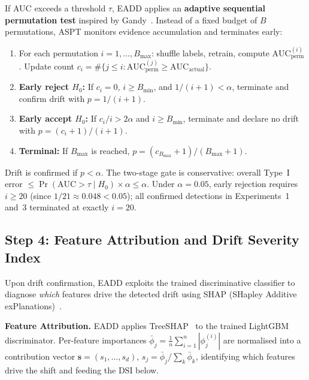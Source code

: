 \documentclass[conference,a4paper]{IEEEtran}
\begin{document}
If AUC exceeds a threshold $\tau$, EADD applies an \textbf{adaptive sequential permutation test} inspired by Gandy~\cite{b30}. Instead of a fixed budget of $B$ permutations, ASPT monitors evidence accumulation and terminates early:
\begin{enumerate}
    \item For each permutation $i = 1, \ldots, B_{\max}$: shuffle labels, retrain, compute $\text{AUC}^{(i)}_{\text{perm}}$. Update count $c_i = \#\{j \leq i : \text{AUC}^{(j)}_{\text{perm}} \geq \text{AUC}_{\text{actual}}\}$.
    \item \textbf{Early reject $H_0$:} If $c_i = 0$, $i \geq B_{\min}$, and $1/(i+1) < \alpha$, terminate and confirm drift with $p = 1/(i+1)$.
    \item \textbf{Early accept $H_0$:} If $c_i/i > 2\alpha$ and $i \geq B_{\min}$, terminate and declare no drift with $p = (c_i+1)/(i+1)$.
    \item \textbf{Terminal:} If $B_{\max}$ is reached, $p = (c_{B_{\max}}{+}1)/(B_{\max}{+}1)$.
\end{enumerate}
Drift is confirmed if $p < \alpha$. The two-stage gate is conservative: overall Type~I error $\leq \Pr(\text{AUC}{>}\tau \mid H_0) \times \alpha \leq \alpha$. Under $\alpha = 0.05$, early rejection requires $i \geq 20$ (since $1/21 \approx 0.048 < 0.05$); all confirmed detections in Experiments~1 and~3 terminated at exactly $i = 20$.

\subsection{Step 4: Feature Attribution and Drift Severity Index}

Upon drift confirmation, EADD exploits the trained discriminative classifier to diagnose \textit{which} features drive the detected drift using SHAP (SHapley Additive exPlanations)~\cite{b24}.

\textbf{Feature Attribution.} EADD applies TreeSHAP~\cite{b31} to the trained LightGBM discriminator. Per-feature importances $\bar{\phi}_j = \frac{1}{n}\sum_{i=1}^{n}|\phi_j^{(i)}|$ are normalised into a contribution vector $\mathbf{s} = (s_1, \ldots, s_d)$, $s_j = \bar{\phi}_j / \sum_k \bar{\phi}_k$, identifying which features drive the shift and feeding the DSI below.
\end{document}
